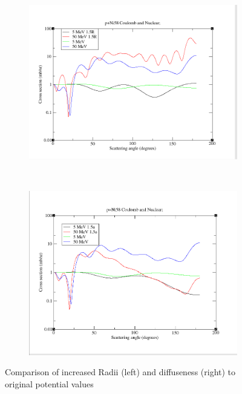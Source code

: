 \documentclass[paper=a4, fontsize=11pt]{scrartcl} %
\numberwithin{equation}{section} %
\numberwithin{figure}{section} %
\numberwithin{table}{section} %
\begin{document}
 \begin{figure}[hbt]
        \centering
        \begin{subfigure}[b!]{0.35\textwidth}
                \includegraphics[width=\textwidth]{ChangedRadius.PNG}
        \end{subfigure}%
        ~ %
\quad
        \begin{subfigure}[b!]{0.35\textwidth}
                \includegraphics[width=\textwidth]{ChangedDiff.PNG}
        \end{subfigure}

        \caption{Comparison of increased Radii (left) and diffuseness (right) to original potential values}
\end{figure}
\end{document}
